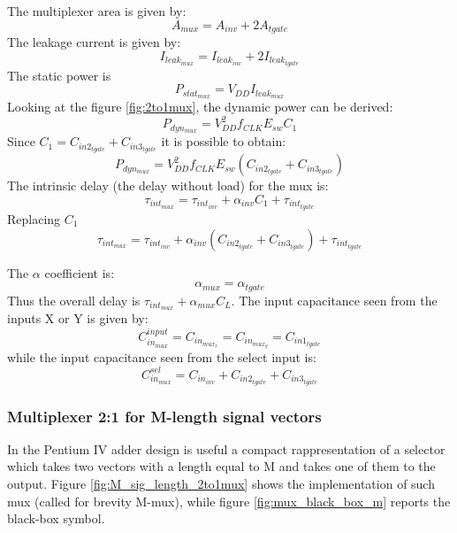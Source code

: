  The multiplexer area is given by:
\begin{equation}
A_{mux} = A_{inv} + 2 A_{tgate}
\end{equation}
The leakage current is given by:
\begin{equation}
I_{leak_{mux}} = I_{leak_{inv}} + 2 I_{leak_{tgate}}
\label{eq:leak_cur_mux}
\end{equation}
The static power is
\begin{equation}
P_{stat_{mux}} = V_{DD} I_{leak_{mux}}
\end{equation}
Looking at the figure \ref{fig:2to1mux}, the dynamic power can be derived:
\begin{equation}
P_{dyn_{mux}} = V_{DD}^2 f_{CLK} E_{sw} C_1 
\end{equation}
Since $C_1 = C_{in2_{tgate}} + C_{in3_{tgate}}$ it is possible to obtain:
\begin{equation}
P_{dyn_{mux}} =  V_{DD}^2 f_{CLK} E_{sw}  (C_{in2_{tgate}} + C_{in3_{tgate}})
\end{equation}
The intrinsic delay (the delay without load) for the mux is:
\begin{equation}
\tau_{int_{mux}} = \tau_{int_{inv}} + \alpha_{inv} C_1 +\tau_{int_{tgate}}
\end{equation}
Replacing $C_1$
\begin{equation}
\tau_{int_{mux}} = \tau_{int_{inv}} + \alpha_{inv} (C_{in2_{tgate}} + C_{in3_{tgate}}) + \tau_{int_{tgate}}
\end{equation}

The $\alpha$ coefficient is:
\begin{equation}
\alpha_{mux} = \alpha_{tgate}
\end{equation}
Thus the overall delay is $\tau_{int_{mux}} + \alpha_{mux} C_L$. The input capacitance seen from the inputs X or Y is given by:
\begin{equation}
C_{in_{mux}}^{input} = C_{in_{mux_x}} = C_{in_{mux_y}} = C_{in1_{tgate}} 
\end{equation}
while the input capacitance seen from the select input is:
\begin{equation}
C_{in_{mux}}^{sel} = C_{in_{inv}} + C_{in2_{tgate}} + C_{in3_{tgate}}
\end{equation}





\subsubsection{Multiplexer 2:1 for M-length signal vectors}
In the Pentium IV adder design is useful a compact rappresentation of a selector which takes two vectors with a length equal to M and takes one of them to the output. Figure \ref{fig:M_sig_length_2to1mux} shows the implementation of such mux (called for brevity M-mux), while figure \ref{fig:mux_black_box_m} reports the black-box symbol.

